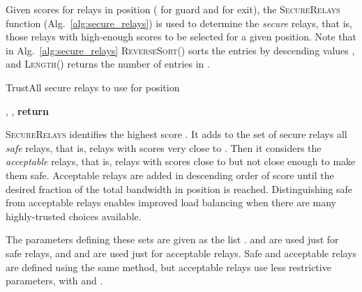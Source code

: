 \documentclass[conference]{styles/IEEEtran}
\begin{document}
Given scores for relays in position  ( for guard and  for exit), the
\textsc{SecureRelays} function (Alg.~\ref{alg:secure_relays}) is used to determine
the \emph{secure} relays, that is, those relays with high-enough scores to be selected for a given
position. Note that in Alg.~\ref{alg:secure_relays} \textsc{ReverseSort}() sorts the entries
 by descending values , and \textsc{Length}() returns the number of entries in
.
\begin{algorithm}
\caption{TrustAll secure relays to use for position }
\label{alg:secure_relays}
\begin{algorithmic}[0]
\State  {}
\State  {}
\State  {} 
\State , , 
\While{\\
    \hspace{\algorithmicindent}\hspace{\algorithmicindent}\\
    \hspace{\algorithmicindent}\hspace{\algorithmicindent}}
  \State 
  \State 
  \State 
\EndWhile
\While{\\
    \hspace{\algorithmicindent}\hspace{\algorithmicindent}\\
    \hspace{\algorithmicindent}\hspace{\algorithmicindent}}
  \State 
  \State 
  \State 
\EndWhile
\State \textbf{return} 
\EndFunction
\end{algorithmic}
\end{algorithm}
\textsc{SecureRelays} identifies the highest score . It adds to the set of secure relays
all \emph{safe} relays, that is, relays with scores very close to . Then it considers the
\emph{acceptable} relays, that is, relays with scores close to  but not close enough to make
them safe. Acceptable relays are added in descending order of score until the desired fraction of
the total bandwidth in position  is reached. Distinguishing safe from acceptable relays enables
improved load balancing when there are many highly-trusted choices available.

The parameters defining these sets are given as the list
.
 and  are used just for safe relays, and  and
 are used just for acceptable relays. Safe and acceptable relays are defined using
the same method, but acceptable relays use less restrictive parameters, with
 and .
\end{document}
